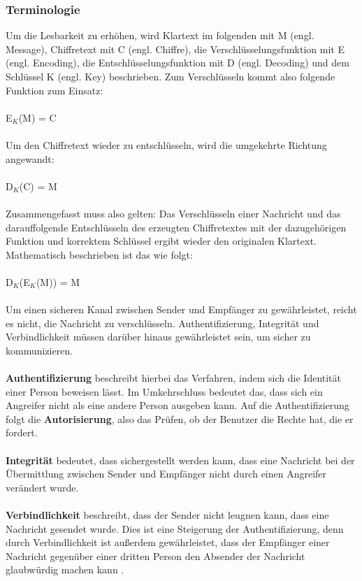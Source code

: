 \documentclass[10pt, a4paper,headsepline]{scrreprt}
\begin{document}
\subsubsection{Terminologie}
Um die Lesbarkeit zu erhöhen, wird Klartext im folgenden mit M (engl. Message), Chiffretext mit C (engl. Chiffre), die Verschlüsselungsfunktion mit E (engl. Encoding), die Entschlüsselungsfunktion mit D (engl. Decoding) und dem Schlüssel K (engl. Key) beschrieben.
Zum Verschlüsseln kommt also folgende Funktion zum Einsatz: \\ \\
E$_{K}$(M) = C\\ \\ 
Um den Chiffretext wieder zu entschlüsseln, wird die umgekehrte Richtung angewandt:\\ \\
D$_{K}$(C) = M\\ \\
Zusammengefasst muss also gelten: Das Verschlüsseln einer Nachricht und das darauffolgende Entschlüsseln des erzeugten Chiffretextes mit der dazugehörigen Funktion und korrektem Schlüssel ergibt wieder den originalen Klartext. Mathematisch beschrieben ist das wie folgt:\\ \\
D$_{K}$(E$_{K}$(M)) = M\\ \\
Um einen sicheren Kanal zwischen Sender und Empfänger zu gewährleistet, reicht es nicht, die Nachricht zu verschlüsseln. Authentifizierung, Integrität und Verbindlichkeit müssen darüber hinaus gewährleistet sein, um sicher zu kommunizieren. \\ \\
\textbf{Authentifizierung} beschreibt hierbei das Verfahren, indem sich die Identität einer Person beweisen lässt. Im Umkehrschluss bedeutet das, dass sich ein Angreifer nicht als eine andere Person ausgeben kann. Auf die Authentifizierung folgt die \textbf{Autorisierung}, also das Prüfen, ob der Benutzer die Rechte hat, die er fordert.\\ \\
\textbf{Integrität} bedeutet, dass sichergestellt werden kann, dass eine Nachricht bei der Übermittlung zwischen Sender und Empfänger nicht durch einen Angreifer verändert wurde. \\ \\
\textbf{Verbindlichkeit} beschreibt,  dass der Sender nicht leugnen kann, dass eine Nachricht gesendet wurde. Dies ist eine Steigerung der Authentifizierung, denn durch Verbindlichkeit ist außerdem gewährleistet, dass der Empfänger einer Nachricht gegenüber einer dritten Person den Absender der Nachricht glaubwürdig machen kann \citep[S. 1f]{book:angewandte-krypto}. \\ \\
\end{document}
